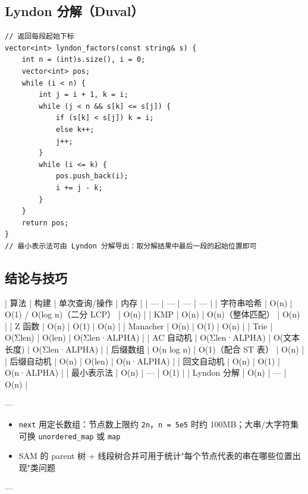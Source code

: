 \subsection{Lyndon 分解（Duval）}

\begin{lstlisting}
// 返回每段起始下标
vector<int> lyndon_factors(const string& s) {
    int n = (int)s.size(), i = 0;
    vector<int> pos;
    while (i < n) {
        int j = i + 1, k = i;
        while (j < n && s[k] <= s[j]) {
            if (s[k] < s[j]) k = i;
            else k++;
            j++;
        }
        while (i <= k) {
            pos.push_back(i);
            i += j - k;
        }
    }
    return pos;
}
// 最小表示法可由 Lyndon 分解导出：取分解结果中最后一段的起始位置即可
\end{lstlisting}


\subsection*{结论与技巧}
| 算法 | 构建 | 单次查询/操作 | 内存 | | --- | --- | --- | --- | | 字符串哈希 | O(n) | O(1) / O(log n)（二分 LCP） | O(n) | | KMP | O(n) | O(n)（整体匹配） | O(n) | | Z 函数 | O(n) | O(1) | O(n) | | Manacher | O(n) | O(1) | O(n) | | Trie | O(Σlen) | O(len) | O(Σlen·ALPHA) | | AC 自动机 | O(Σlen·ALPHA) | O(文本长度) | O(Σlen·ALPHA) | | 后缀数组 | O(n log n) | O(1)（配合 ST 表） | O(n) | | 后缀自动机 | O(n) | O(len) | O(n·ALPHA) | | 回文自动机 | O(n) | O(1) | O(n·ALPHA) | | 最小表示法 | O(n) | — | O(1) | | Lyndon 分解 | O(n) | — | O(n) |

---

\begin{itemize}
  \item \texttt{next} 用定长数组：节点数上限约 \texttt{2n}，\texttt{n = 5e5} 时约 100MB；大串/大字符集可换 \texttt{unordered\_map} 或 \texttt{map}
  \item SAM 的 parent 树 + 线段树合并可用于统计"每个节点代表的串在哪些位置出现"类问题
\end{itemize}
---

